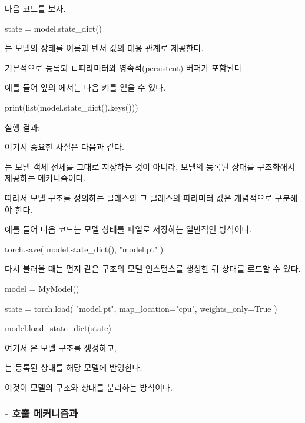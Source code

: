다음 코드를 보자.

\begin{dhkcode}
state = model.state_dict()
\end{dhkcode}

는 모델의 상태를 이름과 텐서 값의 대응 관계로 제공한다.

기본적으로 등록되 ㄴ파라미터와 영속적(persistent) 버퍼가 포함된다.

예를 들어 앞의 에서는 다음 키를 얻을 수 있다.

\begin{dhkcode}
print(list(model.state_dict().keys()))
\end{dhkcode}

실행 결과:

\begin{dhkzsh}
\end{dhkzsh}

여기서 중요한 사실은 다음과 같다.

는 모델 객체 전체를 그대로 저장하는 것이 아니라, 모델의 등록된 상태를 구조화해서 제공하는 메커니즘이다.

따라서 모델 구조를 정의하는 클래스와 그 클래스의 파라미터 값은 개념적으로 구분해야 한다.

예를 들어 다음 코드는 모델 상태를 파일로 저장하는 일반적인 방식이다.

\begin{dhkcode}
torch.save(
    model.state_dict(),
    "model.pt"
)
\end{dhkcode}

다시 불러올 때는 먼저 같은 구조의 모델 인스턴스를 생성한 뒤 상태를 로드할 수 있다.

\begin{dhkcode}
model = MyModel()

state = torch.load(
    "model.pt",
    map_location="cpu",
    weights_only=True
)

model.load_state_dict(state)
\end{dhkcode}

여기서 은 모델 구조를 생성하고,

는 등록된 상태를 해당 모델에 반영한다.

이것이 모델의 구조와 상태를 분리하는 방식이다.

\subsubsection{ - 호출 메커니즘과 }

